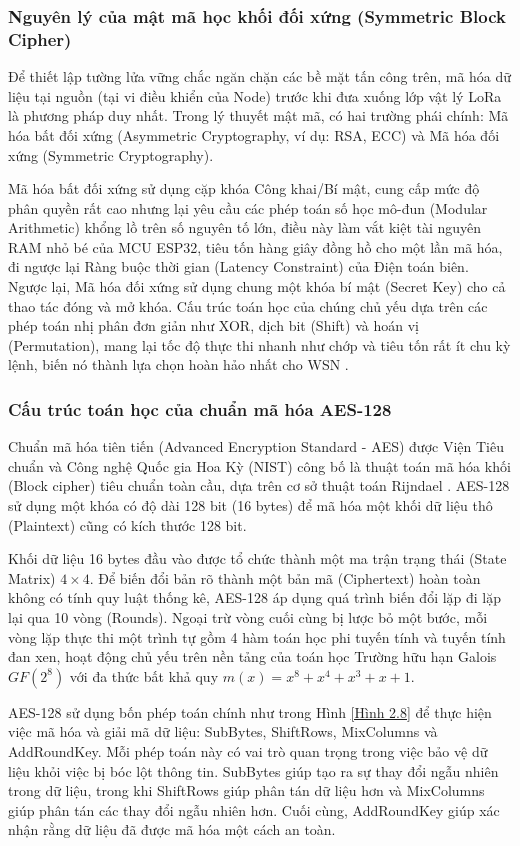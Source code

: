 \subsubsection{Nguyên lý của mật mã học khối đối xứng (Symmetric Block Cipher)}
Để thiết lập tường lửa vững chắc ngăn chặn các bề mặt tấn công trên, mã hóa dữ liệu tại nguồn (tại vi điều khiển của Node) trước khi đưa xuống lớp vật lý LoRa là phương pháp duy nhất. Trong lý thuyết mật mã, có hai trường phái chính: Mã hóa bất đối xứng (Asymmetric Cryptography, ví dụ: RSA, ECC) và Mã hóa đối xứng (Symmetric Cryptography).

Mã hóa bất đối xứng sử dụng cặp khóa Công khai/Bí mật, cung cấp mức độ phân quyền rất cao nhưng lại yêu cầu các phép toán số học mô-đun (Modular Arithmetic) khổng lồ trên số nguyên tố lớn, điều này làm vắt kiệt tài nguyên RAM nhỏ bé của MCU ESP32, tiêu tốn hàng giây đồng hồ cho một lần mã hóa, đi ngược lại Ràng buộc thời gian (Latency Constraint) của Điện toán biên. Ngược lại, Mã hóa đối xứng sử dụng chung một khóa bí mật (Secret Key) cho cả thao tác đóng và mở khóa. Cấu trúc toán học của chúng chủ yếu dựa trên các phép toán nhị phân đơn giản như XOR, dịch bit (Shift) và hoán vị (Permutation), mang lại tốc độ thực thi nhanh như chớp và tiêu tốn rất ít chu kỳ lệnh, biến nó thành lựa chọn hoàn hảo nhất cho WSN \cite{roman2011securing}.
\subsubsection{Cấu trúc toán học của chuẩn mã hóa AES-128}
Chuẩn mã hóa tiên tiến (Advanced Encryption Standard - AES) được Viện Tiêu chuẩn và Công nghệ Quốc gia Hoa Kỳ (NIST) công bố là thuật toán mã hóa khối (Block cipher) tiêu chuẩn toàn cầu, dựa trên cơ sở thuật toán Rijndael \cite{daemen2013design}. AES-128 sử dụng một khóa có độ dài 128 bit (16 bytes) để mã hóa một khối dữ liệu thô (Plaintext) cũng có kích thước 128 bit.

Khối dữ liệu 16 bytes đầu vào được tổ chức thành một ma trận trạng thái (State Matrix) $4 \times 4$. Để biến đổi bản rõ thành một bản mã (Ciphertext) hoàn toàn không có tính quy luật thống kê, AES-128 áp dụng quá trình biến đổi lặp đi lặp lại qua 10 vòng (Rounds). Ngoại trừ vòng cuối cùng bị lược bỏ một bước, mỗi vòng lặp thực thi một trình tự gồm 4 hàm toán học phi tuyến tính và tuyến tính đan xen, hoạt động chủ yếu trên nền tảng của toán học Trường hữu hạn Galois $GF(2^8)$ với đa thức bất khả quy $m(x) = x^8 + x^4 + x^3 + x + 1$.

AES-128 sử dụng bốn phép toán chính như trong Hình \ref{Hình 2.8} để thực hiện việc mã hóa và giải mã dữ liệu: SubBytes, ShiftRows, MixColumns và AddRoundKey. Mỗi phép toán này có vai trò quan trọng trong việc bảo vệ dữ liệu khỏi việc bị bóc lột thông tin. SubBytes giúp tạo ra sự thay đổi ngẫu nhiên trong dữ liệu, trong khi ShiftRows giúp phân tán dữ liệu hơn và MixColumns giúp phân tán các thay đổi ngẫu nhiên hơn. Cuối cùng, AddRoundKey giúp xác nhận rằng dữ liệu đã được mã hóa một cách an toàn.

